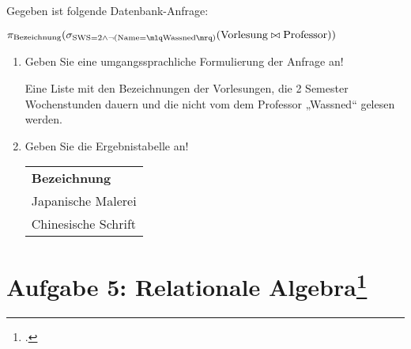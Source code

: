 \documentclass{lehramt-informatik-haupt}
\begin{document}
Gegeben ist folgende Datenbank-Anfrage:

\begin{math}
\pi_{\text{Bezeichnung}}(
  \sigma_{\text{SWS} = 2 \land\neg(\text{Name} = \mlq \text{Wassned} \mrq)}(
    \text{Vorlesung} \bowtie \text{Professor}
  )
)
\end{math}

\begin{enumerate}


\item Geben Sie eine umgangssprachliche Formulierung der Anfrage an!

\begin{antwort}[muster]
Eine Liste mit den Bezeichnungen der Vorlesungen, die 2 Semester
Wochenstunden dauern und die nicht vom dem Professor „Wassned“ gelesen
werden.
\end{antwort}


\item Geben Sie die Ergebnistabelle an!

\begin{antwort}[muster]

\begin{tabular}{|l|}
\hline
\textbf{Bezeichnung}\\
Japanische Malerei\\
Chinesische Schrift\\
\hline
\end{tabular}

\end{antwort}

\end{enumerate}

%

\section{Aufgabe 5: Relationale Algebra\footcite{db:pu:2}}
\end{document}
